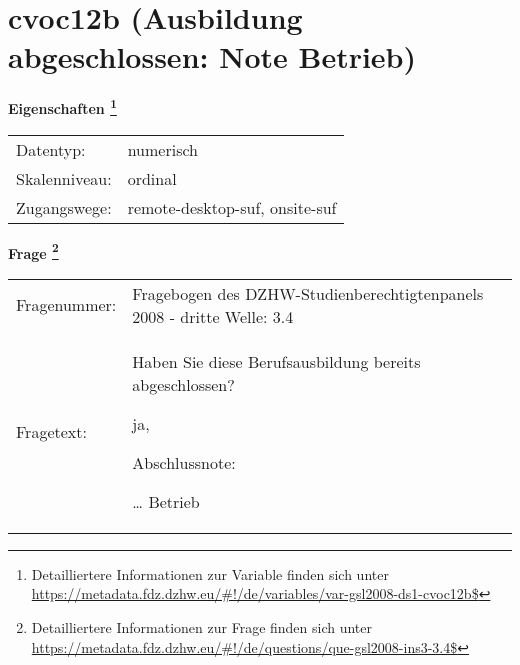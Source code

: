
    \setcounter{footnote}{0}

    \vspace*{-1.8cm}
	\section{cvoc12b (Ausbildung abgeschlossen: Note Betrieb)}
	\label{section:cvoc12b}



    \vspace*{0.5cm}
    \noindent\textbf{Eigenschaften
	\footnote{Detailliertere Informationen zur Variable finden sich unter
		\url{https://metadata.fdz.dzhw.eu/\#!/de/variables/var-gsl2008-ds1-cvoc12b$}}}\\
	\begin{tabularx}{\hsize}{@{}lX}
	Datentyp: & numerisch \\
	Skalenniveau: & ordinal \\
	Zugangswege: &
	  remote-desktop-suf, 
	  onsite-suf
 \\
    \end{tabularx}



				\vspace*{0.5cm}
                \noindent\textbf{Frage
	                \footnote{Detailliertere Informationen zur Frage finden sich unter
		              \url{https://metadata.fdz.dzhw.eu/\#!/de/questions/que-gsl2008-ins3-3.4$}}}\\
				\begin{tabularx}{\hsize}{@{}lX}
					Fragenummer: &
					  Fragebogen des DZHW-Studienberechtigtenpanels 2008 - dritte Welle:
					  3.4
 \\
					Fragetext: & Haben Sie diese Berufsausbildung bereits abgeschlossen?\par  ja,\par  Abschlussnote:\par  … Betrieb \\
				\end{tabularx}






